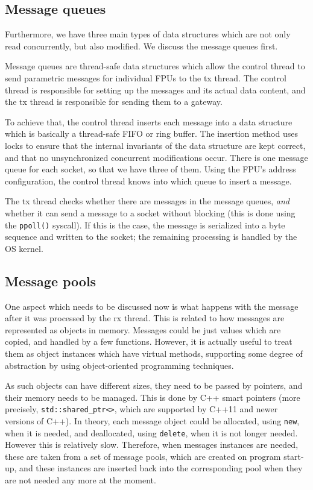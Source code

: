 \documentclass[fontsize=12,a4paper]{scrartcl}
\begin{document}
\subsection{Message queues}
Furthermore, we have three main types of data structures which are not
only read concurrently, but also modified. We discuss the message
queues first.

Message queues are thread-safe data structures which allow the control
thread to send parametric messages for individual FPUs to the tx
thread. The control thread is responsible for setting up the messages
and its actual data content, and the tx thread is responsible for
sending them to a gateway.

To achieve that, the control thread inserts each message into a data
structure which is basically a thread-safe FIFO or ring buffer.  The
insertion method uses locks to ensure that the internal invariants of
the data structure are kept correct, and that no unsynchronized
concurrent modifications occur. There is one message queue for each
socket, so that we have three of them. Using the FPU's address
configuration, the control thread knows into which queue to insert a
message.

The tx thread checks whether there are messages in the message queues,
\emph{and} whether it can send a message to a socket without blocking
(this is done using the \texttt{ppoll()} syscall). If this is the
case, the message is serialized into a byte sequence and written to
the socket; the remaining processing is handled by the OS kernel.



\subsection{Message pools}

One aspect which needs to be discussed now is what happens with the
message after it was processed by the rx thread. This is related to
how messages are represented as objects in memory. Messages could be
just values which are copied, and handled by a few functions. However,
it is actually useful to treat them as object instances which have
virtual methods, supporting some degree of abstraction by using
object-oriented programming techniques.

As such objects can have different sizes, they need to be passed by
pointers, and their memory needs to be managed.  This is done by C++
smart pointers (more precisely, \texttt{std::shared\_ptr<>}, which are
supported by C++11 and newer versions of C++). In theory, each message
object could be allocated, using \texttt{new}, when it is needed, and
deallocated, using \texttt{delete}, when it is not longer
needed. However this is relatively slow. Therefore, when messages
instances are needed, these are taken from a set of message pools,
which are created on program start-up, and these instances are
inserted back into the corresponding pool when they are not needed any
more at the moment.
\end{document}
